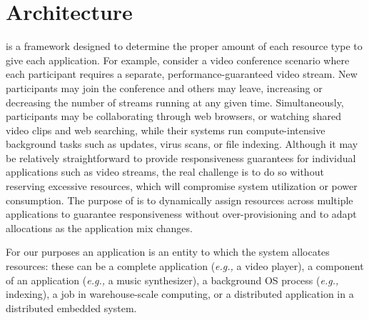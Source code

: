 \section{\pacora Architecture}\label{sys_design}




\pacora is a framework designed to determine the proper amount of each
resource type to give each application.  For example, consider a video
conference scenario where each participant requires a separate,
performance-guaranteed video stream.  New participants may join the
conference and others may leave, increasing or decreasing the number
of streams running at any given time.  Simultaneously, participants
may be collaborating through web browsers, or watching shared video
clips and web searching, while their systems run compute-intensive
background tasks such as updates, virus scans, or file indexing.
Although it may be relatively straightforward to provide
responsiveness guarantees for individual applications such as video
streams, the real challenge is to do so without reserving excessive
resources, which will compromise system utilization or power
consumption. The purpose of \pacora is to dynamically assign resources
across multiple applications to guarantee responsiveness without
over-provisioning and to adapt allocations as the application mix
changes.

For our purposes an application is an entity to which the system
allocates resources: these can be a complete application (\emph{e.g.,}
a video player), a component of an application (\emph{e.g.,} a music
synthesizer), a background OS process (\emph{e.g.,} indexing), a job
in warehouse-scale computing, or a distributed application in a
distributed embedded system.

